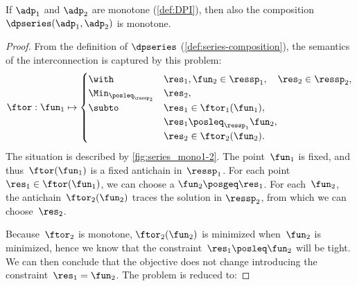 \begin{proposition}
    \label{prop:series-monotone}
    If $\adp_{1}$ and $\adp_{2}$ are monotone (\cref{def:DPI}), then also the composition $\dpseries(\adp_{1},\adp_{2})$ is monotone.
\end{proposition}
\begin{proof}
    From the definition of $\dpseries$ (\cref{def:series-composition}), the semantics of the interconnection is captured by this problem:
    \begin{equation}
        \ftor:\fun_{1}\mapsto\begin{cases}
            \with                       & \res_{1},\fun_{2}\in\ressp_{1},\quad\res_{2}\in\ressp_{2}, \\
            \Min_{\posleq_{\ressp_{2}}} & \res_{2},                                                  \\
            \subto                      & \res_{1}\in\ftor_{1}(\fun_{1}),                            \\
                                        & \res_{1}\posleq_{\ressp_{1}}\fun_{2},                      \\
                                        & \res_{2}\in\ftor_{2}(\fun_{2}).
        \end{cases}\label{eq:dede}
    \end{equation}
    The situation is described by \cref{fig:series_mono1-2}.
    The point~$\fun_{1}$ is fixed, and thus~$\ftor(\fun_{1})$ is a fixed antichain in~$\ressp_{1}$.
    For each point $\res_{1}\in\ftor(\fun_{1})$, we can choose a $\fun_{2}\posgeq\res_{1}$.
    For each~$\fun_{2}$, the antichain~$\ftor_{2}(\fun_{2})$ traces the solution in $\ressp_{2}$, from which we can choose~$\res_{2}$.


    Because~$\ftor_{2}$ is monotone, $\ftor_{2}(\fun_{2})$ is minimized when~$\fun_{2}$ is minimized, hence we know that the constraint~$\res_{1}\posleq\fun_{2}$ will be tight.
    We can then conclude that the objective does not change introducing the constraint~$\res_{1}=\fun_{2}$.
    The problem is reduced to:


\end{proof}
